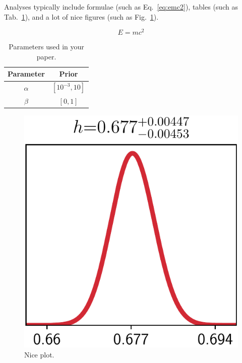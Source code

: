 \documentclass[twocolumn,apj,numberedappendix,appendixfloats]{openjournal}
\begin{document}
Analyses typically include formulae (such as Eq.~\ref{eq:emc2}), tables (such as Tab.~\ref{table:table}), and a lot of nice figures (such as Fig.~\ref{fig:fig}).

\begin{equation}
    E = m c^2 \label{eq:emc2}
\end{equation}

\begin{table}
    \centering
    \caption{Parameters used in your paper.}
    \begin{tabular}{ c c }  
        Parameter & Prior \\
        \hline \hline     
        {\boldmath$\alpha$} & $\left[ 10^{-3}, 10 \right]$ \\
        {\boldmath$\beta$} & $\left[ 0, 1 \right]$ \\   
        \hline \hline  
    \end{tabular}  
    \label{table:table}
\end{table}

\begin{center}
    \begin{figure}[!t]
        \centering
    	\includegraphics[scale=0.3]{figures/probdist.png}
    	\caption{Nice plot.}
        \label{fig:fig}
    \end{figure}
\end{center}
\end{document}
